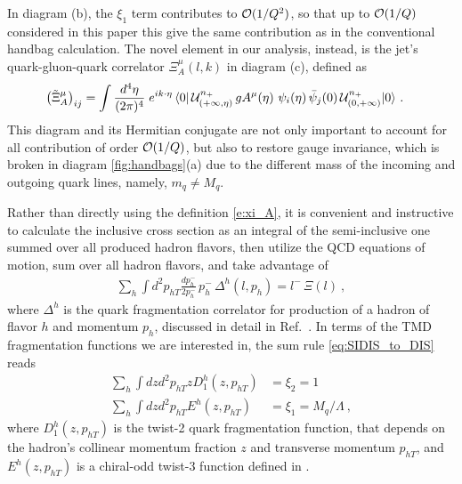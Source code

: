 \documentclass[preprintnumbers,floatfix,nofootinbib]{revtex4}
\newcommand{\de}{d}                    %
\newcommand{\ii}{i}                    %
\newcommand{\mj}{M_q}
\newcommand{\mq}{m_q}
\begin{document}
In diagram (b), the $\xi_1$ term contributes to ${\cal O}(1/Q^2)$, so that up to ${\cal O}(1/Q)$ considered in this paper this give the same contribution as in the conventional handbag calculation. The novel element in our analysis, instead, is the jet's quark-gluon-quark correlator $\Xi_A^{\mu}(l,k)$ in diagram (c), defined as 
\begin{equation} 
\begin{split} 
  \left(\tilde \Xi_A^{\mu} \right)_{ij} &=
   \int \frac{\de^4 \eta}{(2\pi)^{4}}\;
   e^{\ii k \cdot \eta}\,
   \langle 0|\,
   {\cal U}^{n_+}_{(+\infty,\eta)}\,
   g A^{\mu}(\eta)\,
   \,\psi_i(\eta)
   \,\bar{\psi}_j(0)\,
   {\cal U}^{n_+}_{(0,+\infty)}
   |0\rangle \ .
\label{e:xi_A}
\end{split} 
\end{equation}  
This diagram and its Hermitian conjugate are not only important to account for
all contribution of order ${\cal O}(1/Q)$, but also to restore gauge invariance, which is broken in diagram \ref{fig:handbags}(a) due to the different mass
of the incoming and outgoing quark lines, namely, $\mq \neq \mj$. 

Rather than directly using the definition \eqref{e:xi_A}, it is convenient and instructive to calculate the inclusive cross section as an integral of the semi-inclusive one summed over all produced hadron flavors, then utilize the QCD equations of motion, sum over all hadron flavors, and take advantage of  
\begin{align}
  \label{eq:SIDIS_to_DIS}
  \sum_h \int d^2p_{hT}\frac{dp_h^-}{2p_h^-} \,p_h^- \, \Delta^h(l,p_h) = l^-\,\Xi(l) \ , 
\end{align}
where $\Delta^h$ is the quark fragmentation correlator for production of a
hadron of flavor $h$ and momentum $p_h$, discussed in detail in Ref.~\cite{Bacchetta:2006tn}. In terms of
the TMD fragmentation functions we are interested in, the sum rule \eqref{eq:SIDIS_to_DIS} reads 
\begin{align}
  \label{eq:SIDIS_to_DIS_TMDlevel1}
  \sum_h \int dz d^2p_{hT} z D_1^h(z,p_{hT}) & = \xi_2 = 1   \\
  \label{eq:SIDIS_to_DIS_TMDlevel2}
  \sum_h \int dz d^2p_{hT} E^h(z,p_{hT}) & = \xi_1 = \mj / \Lambda\ ,
\end{align}
where $D_1^h(z,p_{hT})$ is the twist-2 quark fragmentation function, that depends on the hadron's collinear momentum fraction $z$ and transverse
momentum $p_{hT}$, and $E^h(z,p_{hT})$ is a chiral-odd twist-3 function
defined in \cite{Bacchetta:2006tn}. 
\end{document}
